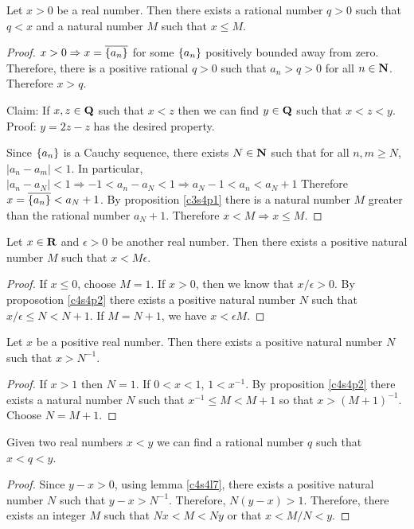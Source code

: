\begin{prop}\label{c4s4p2}
Let $x > 0$ be a real number. Then there exists a rational number $q > 0$
such that $q < x$ and a natural number $M$ such that $x \le M$.
\end{prop}
\begin{proof}
$x > 0 \Rightarrow x = \overline{\{a_n\}}$ for some $\{a_n\}$ 
positively bounded away from zero. Therefore, there is a positive rational
$q > 0$ such that $a_n > q > 0$ for all $n \in \mathbf{N}$. Therefore $x > q$.

Claim: If $x, z \in \mathbf{Q}$ such that $x < z$ then we can find $y \in \mathbf{Q}$
such that $x < z < y$.
Proof: $y = 2z - z$ has the desired property.

Since $\{a_n\}$ is a Cauchy sequence, there exists $N \in \mathbf{N}$ such 
that for all $n, m \ge N$, $|a_n - a_m| < 1$. In particular, $|a_n - a_N|
< 1 \Rightarrow -1 < a_n - a_N < 1 \Rightarrow a_N - 1 < a_n < a_N + 1$
Therefore $x = \overline{\{a_n\}} < a_N + 1$. By proposition 
\ref{c3s4p1} there is a natural number $M$ greater than the rational number
$a_N + 1$. Therefore $x < M \Rightarrow x \le M$.
\end{proof}

\begin{prop}\label{c4s4p3}
Let $x \in \mathbf{R}$ and $\epsilon > 0$ be another real number. Then there 
exists a positive natural number $M$ such that $x < M\epsilon$.
\end{prop}
\begin{proof}
If $x \le 0$, choose $M = 1$. If $x > 0$, then we know that $x/\epsilon > 
0$. By proposotion \ref{c4s4p2} there exists a positive natural number 
$N$ such that $x/\epsilon \le N < N + 1$. If $M = N + 1$, we have $x < 
\epsilon M$.
\end{proof}

\begin{lem}\label{c4s4l7}
Let $x$ be a positive real number. Then there exists a positive natural
number $N$ such that $x > N^{-1}$.
\end{lem}
\begin{proof}
If $x > 1$ then $N = 1$. If $0 < x < 1$, $1 < x^{-1}$. By proposition 
\ref{c4s4p2} there exists a natural number $N$ such that $x^{-1} \le M <
M + 1$ so that $x > (M + 1)^{-1}$. Choose $N = M + 1$.
\end{proof}

\begin{prop}\label{c4s4p4}
Given two real numbers $x < y$ we can find a rational number $q$ such
that $x < q < y$.
\end{prop}
\begin{proof}
Since $y - x > 0$, using lemma \ref{c4s4l7}, there exists a positive
natural number $N$ such that $y - x > N^{-1}$. Therefore, $N(y - x) > 1$.
Therefore, there exists an integer $M$ such that $Nx < M < Ny$ or that
$x < M/N < y$.
\end{proof}
